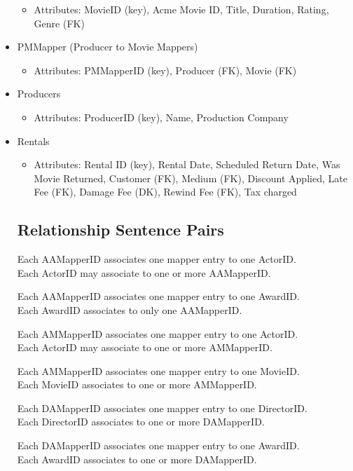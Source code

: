 \documentclass[letterpaper,12pt]{article}
\begin{document}
\begin{itemize}
	      \begin{itemize}
		      \item Attributes: MovieID (key), Acme Movie ID, Title, Duration, Rating, Genre (FK)
	      \end{itemize}
	\item PMMapper (Producer to Movie Mappers)
	      \begin{itemize}
		      \item Attributes: PMMapperID (key), Producer (FK), Movie (FK)
	      \end{itemize}
	\item Producers
	      \begin{itemize}
		      \item Attributes: ProducerID (key), Name, Production Company
	      \end{itemize}
	\item Rentals
	      \begin{itemize}
		      \item Attributes: Rental ID (key), Rental Date, Scheduled Return Date, Was Movie Returned, Customer (FK), Medium (FK), Discount Applied, Late Fee (FK), Damage Fee (DK), Rewind Fee (FK), Tax charged
	      \end{itemize}

\subsection{Relationship Sentence Pairs}
Each AAMapperID associates one mapper entry to one ActorID.\\
Each ActorID may associate to one or more AAMapperID.

Each AAMapperID associates one mapper entry to one AwardID.\\
Each AwardID associates to only one AAMapperID.

Each AMMapperID associates one mapper entry to one ActorID.\\
Each ActorID may associate to one or more AMMapperID.

Each AMMapperID associates one mapper entry to one MovieID.\\
Each MovieID associates to one or more AMMapperID.

Each DAMapperID associates one mapper entry to one DirectorID.\\
Each DirectorID associates to one or more DAMapperID.

Each DAMapperID associates one mapper entry to one AwardID.\\
Each AwardID associates to one or more DAMapperID.


\end{itemize}
\end{document}
